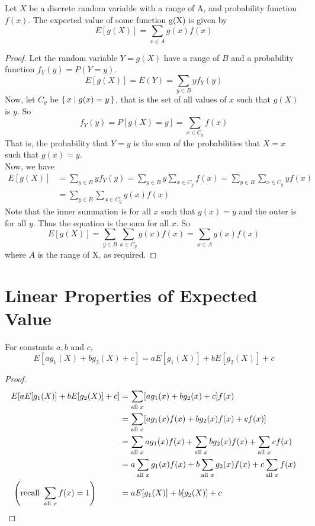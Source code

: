 \begin{theorem}
Let $X$ be a discrete random variable with a range of A, and probability function $f(x)$. The expected value of some function g(X) is given by
\[
    E\left[g(X)\right] = \sum_{x \in A} g(x)f(x)
\]
\end{theorem}
\begin{proof}
Let the random variable $Y = g(X)$ have a range of $B$ and a probability function $f_{\scriptscriptstyle Y}(y) = P(Y = y)$.
\[
    E[g(X)] = E(Y) = \sum_{y \in B} yf_{\scriptscriptstyle Y}(y)
\]
Now, let $C_y$ be $\{\, x \mid g(x) = y \,\}$, that is the set of all values of $x$ such that $g(X)$ is $y$. So
\[
    f_{\scriptscriptstyle Y}(y) = P[g(X) = y]=\sum_{x \in C_y} f(x)
\]
That is, the probability that $Y = y$ is the sum of the probabilities that $X = x$ such that $g(x) = y$. \\
Now, we have
\begin{align*}
    E[g(X)] &= \sum_{y \in B} yf_{\scriptscriptstyle Y}(y) 
             = \sum_{y \in B} y\sum_{x \in C_y}  f(x) 
             = \sum_{y \in B}  \sum_{x \in C_y} yf(x) \\
            &= \sum_{y \in B}  \sum_{x \in C_y}  g(x)f(x)&
\end{align*}
Note that the inner summation is for all $x$ such that $g(x) = y$ and the outer is for all $y$. Thus the equation is the sum for all $x$. So
\[
    E[g(X)] = \sum_{y \in B} \sum_{x \in C_y} g(x)f(x) 
            = \sum_{x \in A} g(x)f(x)
\]
where $A$ is the range of X, as required.
\end{proof}

\section{Linear Properties of Expected Value}
\begin{theorem}
For constants $a,b$ and $c$,
\[
    E[ag_1(X) + bg_2(X) + c] = aE[g_1(X)] + bE[g_2(X)] + c
\]
\end{theorem}
\begin{proof}
\begin{align*}
    E[aE[g_1(X)] + bE[g_2(X)]+c]
    &= \sum_{\text{all } x} [ag_1(x)+bg_2(x)+c]f(x) \\
    &= \sum_{\text{all } x} [ag_1(x)f(x)+bg_2(x)f(x)+cf(x)] \\
    &= \sum_{\text{all } x}ag_1(x)f(x)+\sum_{\text{all } x}bg_2(x)f(x)+\sum_{\text{all } x}cf(x) \\
    &= a\sum_{\text{all } x}g_1(x)f(x)+b\sum_{\text{all } x}g_2(x)f(x)+c\sum_{\text{all } x}f(x) \\
    \left(\text{recall }\sum_{\text{all } x}f(x) = 1\right) \hspace{1cm}
    &= aE[g_1(X)] + b[g_2(X)] + c
\end{align*}
\end{proof}
